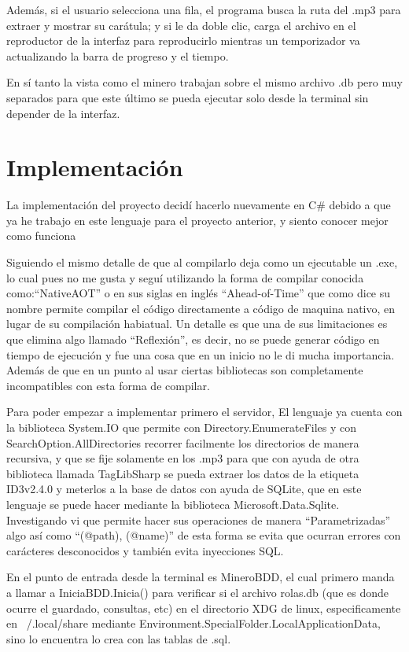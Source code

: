 \documentclass[12pt,letterpaper]{article}
\begin{document}
Además, si el usuario selecciona una fila, el programa busca la ruta del .mp3 para extraer y mostrar su carátula; y si le da doble clic, carga el archivo en el reproductor de la interfaz para reproducirlo mientras un temporizador va actualizando la barra de progreso y el tiempo.

En sí tanto la vista como el minero trabajan sobre el mismo archivo .db pero muy separados para que este último se pueda ejecutar solo desde la terminal sin depender de la interfaz.

\newpage
\section{Implementación}
La implementación del proyecto decidí hacerlo nuevamente en C\# debido a que ya he trabajo en este lenguaje para el proyecto anterior, y siento conocer mejor como funciona 

Siguiendo el mismo detalle de que al compilarlo deja como un ejecutable un .exe, lo cual pues no me gusta y seguí utilizando la forma de compilar conocida como:``NativeAOT'' o en sus siglas en inglés ``Ahead-of-Time'' que como dice su nombre permite compilar el código directamente a código de maquina nativo, en lugar de su compilación habiatual. Un detalle es que una de sus limitaciones es que elimina algo llamado ``Reflexión'', es decir, no se puede generar código en tiempo de ejecución y fue una cosa que en un inicio no le di mucha importancia. Además de que en un punto al usar ciertas bibliotecas son completamente incompatibles con esta forma de compilar.

Para poder empezar a implementar primero el servidor, El lenguaje ya cuenta con la biblioteca System.IO que permite con Directory.EnumerateFiles y con SearchOption.AllDirectories recorrer facilmente los directorios de manera recursiva, y que se fije solamente en los .mp3 para que con ayuda de otra biblioteca llamada TagLibSharp se pueda extraer los datos de la etiqueta ID3v2.4.0 y meterlos a la base de datos con ayuda de SQLite, que en este lenguaje se puede hacer mediante la biblioteca Microsoft.Data.Sqlite. Investigando vi que permite hacer sus operaciones de manera ``Parametrizadas'' algo así como ``(@path), (@name)'' de esta forma se evita que ocurran errores con carácteres desconocidos y también evita inyecciones SQL.

En el punto de entrada desde la terminal es MineroBDD, el cual primero manda a llamar a IniciaBDD.Inicia() para verificar si el archivo rolas.db (que es donde ocurre el guardado, consultas, etc) en el directorio XDG de linux, especificamente en ~/.local/share mediante Environment.SpecialFolder.LocalApplicationData, sino lo encuentra lo crea con las tablas de .sql.
\end{document}
